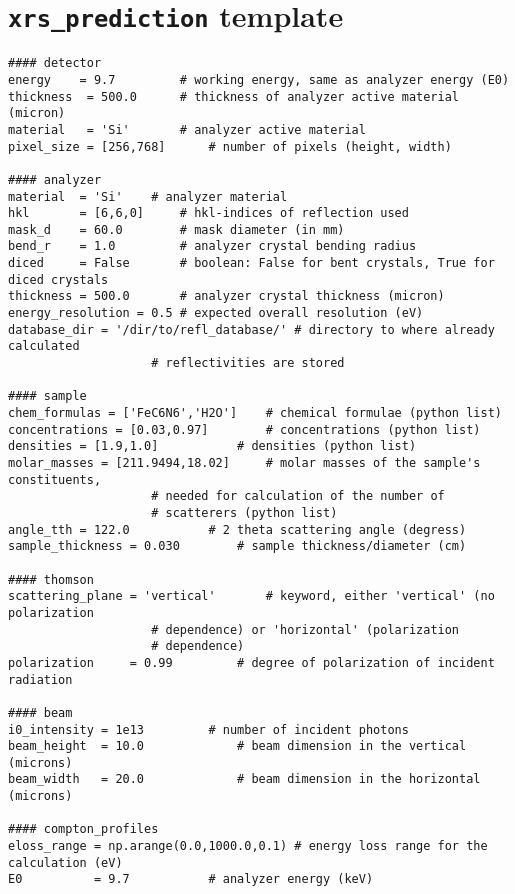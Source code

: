 \documentclass[aps,prl,groupedaddress]{revtex4}
\begin{document}

\appendix
\section{\texttt{xrs\_prediction} template}\label{apx:planning}

\lstset{style=python}
\begin{lstlisting}[frame=single]
#### detector
energy    = 9.7			# working energy, same as analyzer energy (E0)
thickness  = 500.0		# thickness of analyzer active material (micron)
material   = 'Si'		# analyzer active material
pixel_size = [256,768]		# number of pixels (height, width)

#### analyzer
material  = 'Si'	# analyzer material
hkl       = [6,6,0] 	# hkl-indices of reflection used
mask_d    = 60.0    	# mask diameter (in mm)
bend_r    = 1.0	    	# analyzer crystal bending radius
diced     = False   	# boolean: False for bent crystals, True for diced crystals 
thickness = 500.0   	# analyzer crystal thickness (micron)
energy_resolution = 0.5	# expected overall resolution (eV)
database_dir = '/dir/to/refl_database/' # directory to where already calculated 
					# reflectivities are stored

#### sample
chem_formulas = ['FeC6N6','H2O']	# chemical formulae (python list)
concentrations = [0.03,0.97]		# concentrations (python list)
densities = [1.9,1.0]			# densities (python list)
molar_masses = [211.9494,18.02]		# molar masses of the sample's constituents, 
					# needed for calculation of the number of 
					# scatterers (python list)
angle_tth = 122.0 			# 2 theta scattering angle (degress)
sample_thickness = 0.030		# sample thickness/diameter (cm)

#### thomson
scattering_plane = 'vertical'		# keyword, either 'vertical' (no polarization 
					# dependence) or 'horizontal' (polarization 
					# dependence)
polarization     = 0.99			# degree of polarization of incident radiation

#### beam
i0_intensity = 1e13			# number of incident photons
beam_height  = 10.0 			# beam dimension in the vertical (microns)
beam_width   = 20.0 			# beam dimension in the horizontal (microns)

#### compton_profiles
eloss_range = np.arange(0.0,1000.0,0.1)	# energy loss range for the calculation (eV)
E0          = 9.7			# analyzer energy (keV)
\end{lstlisting}
\end{document}
